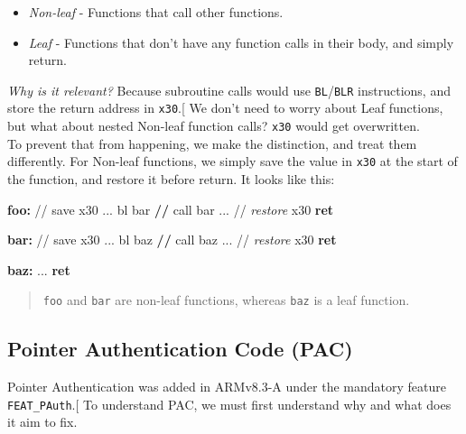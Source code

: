 \documentclass[a4paper, nobind]{templates/ociamthesis}
\providecommand{\tightlist}{%
  \setlength{\itemsep}{0pt}\setlength{\parskip}{0pt}}
\newenvironment{Shaded}{\begin{snugshade}}{\end{snugshade}}
\newcommand{\ControlFlowTok}[1]{\textcolor[rgb]{0.13,0.29,0.53}{\textbf{#1}}}
\newcommand{\FunctionTok}[1]{\textcolor[rgb]{0.13,0.29,0.53}{\textbf{#1}}}
\newcommand{\NormalTok}[1]{#1}
\newcommand{\OperatorTok}[1]{\textcolor[rgb]{0.81,0.36,0.00}{\textbf{#1}}}
\newcommand{\PreprocessorTok}[1]{\textcolor[rgb]{0.56,0.35,0.01}{\textit{#1}}}
\renewenvironment{Shaded}
{
  \vspace{10pt}%
  \begin{snugshade}%
}{%
  \end{snugshade}%
  \vspace{8pt}%
}
\begin{document}
\begin{itemize}
\tightlist
\item
  \emph{Non-leaf} - Functions that call other functions.
\item
  \emph{Leaf} - Functions that don't have any function calls in their body, and simply return.
\end{itemize}

\emph{Why is it relevant?}
Because subroutine calls would use \texttt{BL}/\texttt{BLR} instructions,
and store the return address in \texttt{x30}.{[}\citeproc{ref-arm-arch-manual}{7}{]}
We don't need to worry about Leaf functions,
but what about nested Non-leaf function calls? \texttt{x30} would get overwritten.\\
To prevent that from happening, we make the distinction, and treat them differently.
For Non-leaf functions, we simply save the value in \texttt{x30} at the start of the function,
and restore it before return. It looks like this:

\begin{Shaded}
\begin{Highlighting}[]
\FunctionTok{foo:}
\NormalTok{  // save x30}
\NormalTok{  ...}
\NormalTok{  bl bar  }\OperatorTok{//}\NormalTok{ call bar}
\NormalTok{  ...}
\NormalTok{  // }\PreprocessorTok{restore}\NormalTok{ x30}
  \ControlFlowTok{ret}

\FunctionTok{bar:}
\NormalTok{  // save x30}
\NormalTok{  ...}
\NormalTok{  bl baz  }\OperatorTok{//}\NormalTok{ call baz}
\NormalTok{  ...}
\NormalTok{  // }\PreprocessorTok{restore}\NormalTok{ x30}
  \ControlFlowTok{ret}

\FunctionTok{baz:}
\NormalTok{  ...}
  \ControlFlowTok{ret}
\end{Highlighting}
\end{Shaded}

\begin{quote}
\texttt{foo} and \texttt{bar} are non-leaf functions, whereas \texttt{baz} is a leaf function.
\end{quote}

\subsection{Pointer Authentication Code (PAC)}\label{pac-bg}

Pointer Authentication was added in ARMv8.3-A under the mandatory feature \texttt{FEAT\_PAuth}.{[}\citeproc{ref-arm-feat-names}{9}{]}
To understand PAC, we must first understand why and what does it aim to fix.
\end{document}
